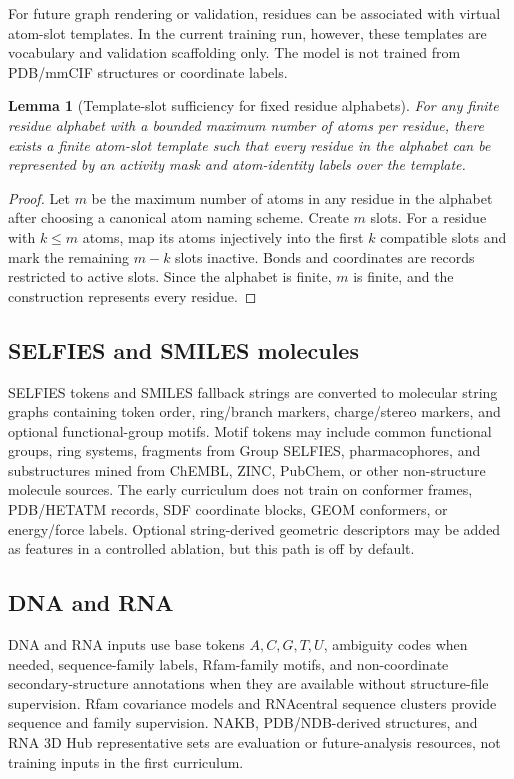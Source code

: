 \documentclass[11pt]{article}
\newtheorem{lemma}[definition]{Lemma}
\newcommand{\1}{\mathbf{1}}
\begin{document}
For future graph rendering or validation, residues can be associated with virtual atom-slot templates. In the current training run, however, these templates are vocabulary and validation scaffolding only. The model is not trained from PDB/mmCIF structures or coordinate labels.

\begin{lemma}[Template-slot sufficiency for fixed residue alphabets]
For any finite residue alphabet with a bounded maximum number of atoms per residue, there exists a finite atom-slot template such that every residue in the alphabet can be represented by an activity mask and atom-identity labels over the template.
\end{lemma}
\begin{proof}
Let $m$ be the maximum number of atoms in any residue in the alphabet after choosing a canonical atom naming scheme. Create $m$ slots. For a residue with $k\leq m$ atoms, map its atoms injectively into the first $k$ compatible slots and mark the remaining $m-k$ slots inactive. Bonds and coordinates are records restricted to active slots. Since the alphabet is finite, $m$ is finite, and the construction represents every residue.\end{proof}

\subsection{SELFIES and SMILES molecules}

SELFIES tokens and SMILES fallback strings are converted to molecular string graphs containing token order, ring/branch markers, charge/stereo markers, and optional functional-group motifs. Motif tokens may include common functional groups, ring systems, fragments from Group SELFIES, pharmacophores, and substructures mined from ChEMBL, ZINC, PubChem, or other non-structure molecule sources. The early curriculum does not train on conformer frames, PDB/HETATM records, SDF coordinate blocks, GEOM conformers, or energy/force labels. Optional string-derived geometric descriptors may be added as features in a controlled ablation, but this path is off by default.

\subsection{DNA and RNA}

DNA and RNA inputs use base tokens $A,C,G,T,U$, ambiguity codes when needed, sequence-family labels, Rfam-family motifs, and non-coordinate secondary-structure annotations when they are available without structure-file supervision. Rfam covariance models and RNAcentral sequence clusters provide sequence and family supervision. NAKB, PDB/NDB-derived structures, and RNA 3D Hub representative sets are evaluation or future-analysis resources, not training inputs in the first curriculum.
\end{document}
